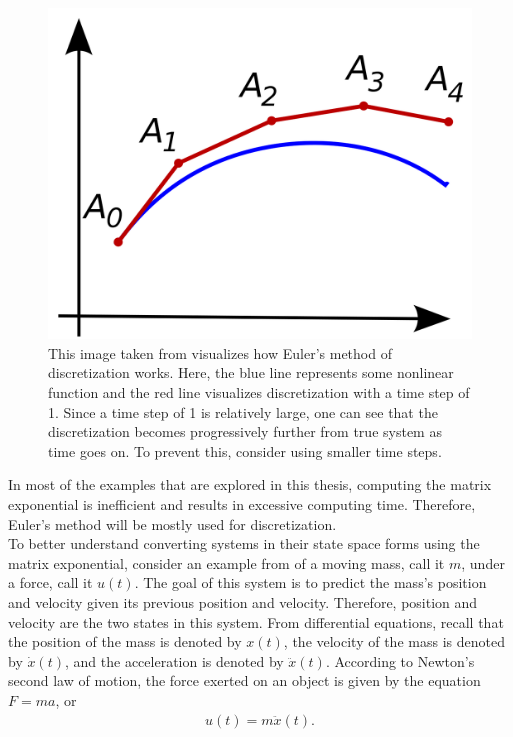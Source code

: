 \begin{figure}[ht]
    \centering
    \includegraphics[scale = 0.15]{EM.png}
    \caption{This image taken from \cite{EM_image} visualizes how Euler's method of discretization works. Here, the blue line represents some nonlinear function and the red line visualizes discretization with a time step of 1. Since a time step of 1 is relatively large, one can see that the discretization becomes progressively further from true system as time goes on. To prevent this, consider using smaller time steps.}
    \label{fig:EM}
\end{figure}

\noindent In most of the examples that are explored in this thesis, computing the matrix exponential is inefficient and results in excessive computing time. Therefore, Euler's method will be mostly used for discretization. \\

\noindent To better understand converting systems in their state space forms using the matrix exponential, consider an example from \cite{bolviken} of a moving mass, call it $m$, under a force, call it $u(t)$. The goal of this system is to predict the mass's position and velocity given its previous position and velocity. Therefore, position and velocity are the two states in this system. From differential equations, recall that the position of the mass is denoted by $x(t)$, the velocity of the mass is denoted by $\dot{x}(t)$, and the acceleration is denoted by $\ddot{x}(t)$. According to Newton's second law of motion, the force exerted on an object is given by the equation $F=ma$, or
\begin{align*}
u(t)=m\ddot{x}(t).
\end{align*}

